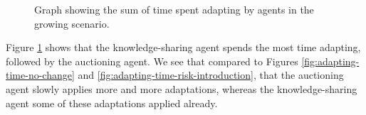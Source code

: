\begin{figure}[H]
    \centering
        
    \caption{Graph showing the sum of time spent adapting by agents in the growing scenario.}
    \label{fig:adapting-time-growing}
\end{figure}

Figure \ref{fig:adapting-time-growing} shows that the knowledge-sharing agent spends the most time adapting, followed by the auctioning agent. We see that compared to Figures \ref{fig:adapting-time-no-change} and \ref{fig:adapting-time-risk-introduction}, that the auctioning agent slowly applies more and more adaptations, whereas the knowledge-sharing agent some of these adaptations applied already. 
